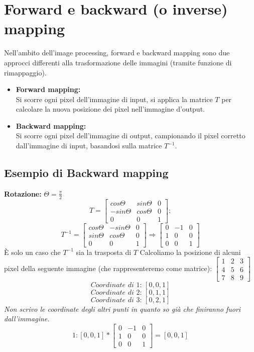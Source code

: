 \documentclass{report}
\begin{document}
\section{Forward e backward (o inverse) mapping}
Nell'ambito dell'image processing, forward e backward mapping sono due approcci differenti alla trasformazione delle immagini (tramite funzione di rimappaggio).
\begin{itemize}
	\item \textbf{Forward mapping:}\\
	      Si scorre ogni pixel dell'immagine di input, si applica la matrice $T$ per calcolare la nuova posizione dei pixel nell'immagine d'output.
	\item \textbf{Backward mapping:}\\
	      Si scorre ogni pixel dell'immagine di output, campionando il pixel corretto dall'immagine di input, basandosi sulla matrice $T^{-1}$.
\end{itemize}

\subsection{Esempio di Backward mapping}
\textbf{Rotazione:}
$\Theta = \frac{\pi}{2}$
$$
T =
\begin{bmatrix}
	cos\Theta  & sin\Theta & 0 \\
	-sin\Theta & cos\Theta & 0 \\
	0          & 0         & 1 
\end{bmatrix};
$$
$$
T^{-1} =
\begin{bmatrix}
	cos\Theta & -sin\Theta & 0 \\
	sin\Theta & cos\Theta  & 0 \\
	0         & 0          & 1 
\end{bmatrix}
\Rightarrow 
\begin{bmatrix}
	0 & -1 & 0 \\
	1 & 0  & 0 \\
	0 & 0  & 1 
\end{bmatrix}
$$
È solo un caso che $T^{-1}$ sia la trasposta di $T$
Calcoliamo la posizione di alcuni pixel della seguente immagine (che rappresenteremo come matrice):
$
\begin{bmatrix}
	1 & 2 & 3 \\
	4 & 5 & 6 \\
	7 & 8 & 9 
\end{bmatrix}
$
$$
\textit{Coordinate di 1: } [0,0,1]
$$
$$
\textit{Coordinate di 2: } [0,1,1]
$$
$$
\textit{Coordinate di 3: } [0,2,1]
$$
\textit{Non scrivo le coordinate degli altri punti in quanto so già che finiranno fuori dall'immagine.}
$$
1: [0, 0, 1] * \begin{bmatrix}
0 & -1 & 0 \\
1 & 0 & 0 \\
0 & 0 & 1 
\end{bmatrix} = [0, 0, 1]
$$
\end{document}
